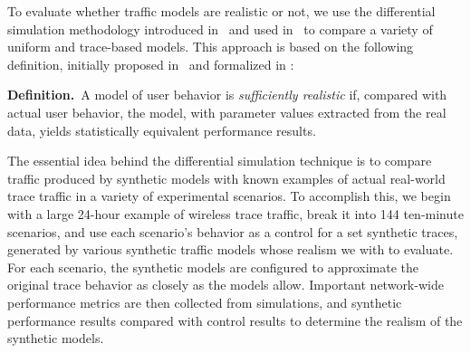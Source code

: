 \documentclass[conference]{IEEEtran}
\begin{document}
To evaluate whether traffic models are realistic or not, we use the differential simulation methodology introduced in~\cite{Karpinski07:realism} and used in~\cite{Karpinski07:cbr-failure} to compare a variety of uniform and trace-based models. This approach is based on the following definition, initially proposed in~\cite{Karpinski07:realism} and formalized in \cite{Karpinski07:cbr-failure}:

\vspace{0.5em}
\begin{samepage}
\noindent\textbf{Definition.}~A model of user behavior is \textit{sufficiently realistic} if, compared with actual user behavior, the model, with parameter values extracted from the real data, yields statistically equivalent performance results.
\end{samepage}
\vspace{0.5em}

The essential idea behind the differential simulation technique is to compare traffic produced by synthetic models with known examples of actual real-world trace traffic in a variety of experimental scenarios. To accomplish this, we begin with a large 24-hour example of wireless trace traffic, break it into 144 ten-minute scenarios, and use each scenario's behavior as a control for a set synthetic traces, generated by various synthetic traffic models whose realism we with to evaluate. For each scenario, the synthetic models are configured to approximate the original trace behavior as closely as the models allow. Important network-wide performance metrics are then collected from simulations, and synthetic performance results compared with control results to determine the realism of the synthetic models.


\end{document}
